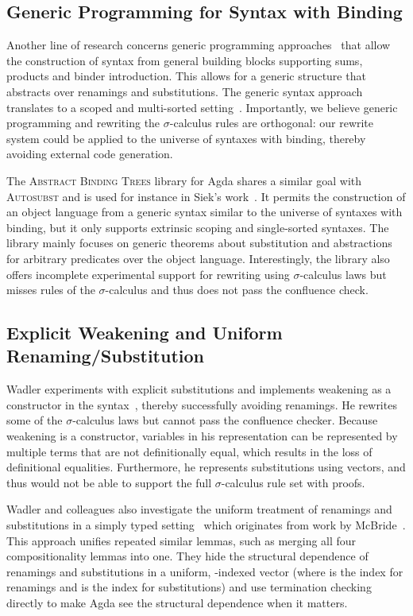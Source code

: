 \documentclass[a4paper,UKenglish,cleveref, autoref, thm-restate,anonymous]{lipics-v2021}
\begin{document}
\subsection*{Generic Programming for Syntax with Binding}
Another line of research concerns generic programming
approaches~\cite{allais2021typescopesafeuniverse, 10.1145/3018610.3018613} that
allow the construction of syntax from general building blocks supporting sums,
products and binder introduction. This allows for a generic structure that
abstracts over renamings and substitutions. The generic syntax approach
translates to a scoped and multi-sorted
setting~\cite{saffrich:LIPIcs.ITP.2024.32}. Importantly, we believe generic
programming and rewriting the $σ$-calculus rules are orthogonal: our rewrite
system could be applied to the universe of syntaxes with binding, thereby
avoiding external code generation.

The \textsc{Abstract Binding Trees} library for Agda shares a similar goal
with \textsc{Autosubst} and is used for instance in Siek's
work~\cite{siek2021parameterized}. It permits the construction of an object
language from a generic syntax similar to the universe of syntaxes with
binding, but it only supports extrinsic scoping and single-sorted syntaxes.
The library mainly focuses on generic theorems about substitution and
abstractions for arbitrary predicates over the object language. Interestingly,
the library also offers incomplete experimental support for rewriting using
$σ$-calculus laws but misses rules of the $σ$-calculus and thus does not pass
the confluence check.

\subsection*{Explicit Weakening and Uniform Renaming/Substitution}
Wadler experiments with explicit substitutions and implements weakening as a
constructor in the syntax~\cite{Wadler_2024}, thereby successfully avoiding
renamings. He rewrites some of the $σ$-calculus laws but cannot pass the
confluence checker. Because weakening is a constructor, variables in his
representation can be represented by multiple terms that are not definitionally
equal, which results in the loss of definitional equalities. Furthermore, he
represents substitutions using vectors, and thus would not be able to support
the full $σ$-calculus rule set with proofs.

Wadler and colleagues also investigate the uniform treatment of renamings and
substitutions in a simply typed setting~\cite{altenkirch2025substitution} which
originates from work by McBride~\cite{ren-sub}. This approach unifies repeated
similar lemmas, such as merging all four compositionality lemmas into one. They
hide the structural dependence of renamings and substitutions in a uniform,
-indexed vector (where  is the
index for renamings and  is the index for
substitutions) and use termination checking directly to make Agda see the
structural dependence when it matters.
\end{document}

